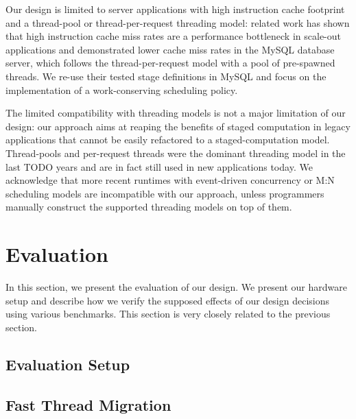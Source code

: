 \documentclass[12pt,a4paper]{book}
\begin{document}
Our design is limited to server applications with high instruction cache footprint and a thread-pool or thread-per-request threading model:
related work has shown that high instruction cache miss rates are a performance bottleneck in scale-out applications
and demonstrated lower cache miss rates in the MySQL database server, which follows the thread-per-request model with a pool of pre-spawned threads.
We re-use their tested stage definitions in MySQL  and focus on the implementation of a work-conserving scheduling policy.
\cite{kanev2015profiling,mysqlThreading}

The limited compatibility with threading models is not a major limitation of our design:
our approach aims at reaping the benefits of staged computation in legacy applications that cannot be easily refactored to a staged-computation model.
Thread-pools and per-request threads were the dominant threading model in the last TODO years and are in fact still used in new applications today.
We acknowledge that more recent runtimes with event-driven concurrency or M:N scheduling models are incompatible with our approach, unless programmers manually construct the supported threading models on top of them.


\chapter{Evaluation}\label{ch:eval}
In this section, we present the evaluation of our design.
We present our hardware setup and describe how we verify the supposed effects of our design decisions using various benchmarks.
This section is very closely related to the previous section.
\section{Evaluation Setup}
\section{Fast Thread Migration}
\end{document}
